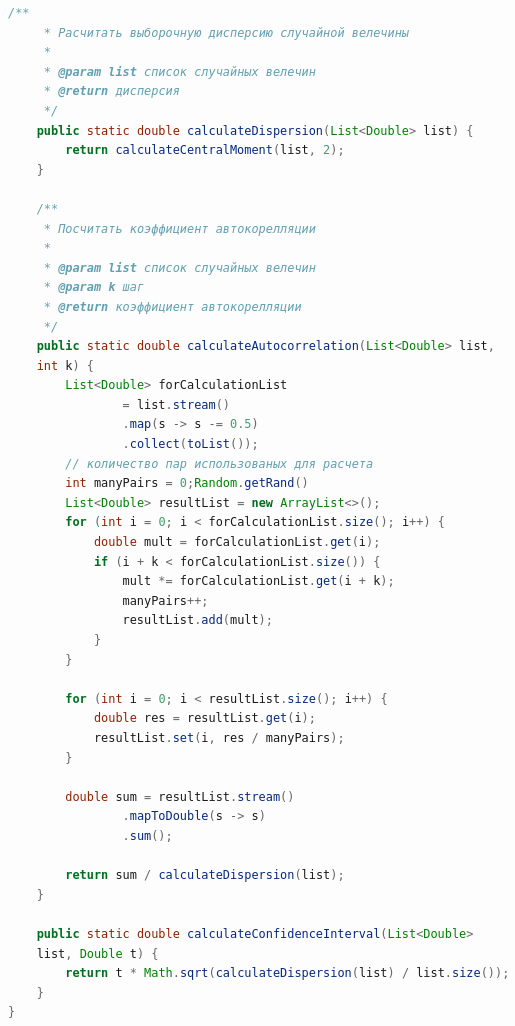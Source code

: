 \documentclass[a4paper,12pt]{article}
\begin{document}
\begin{lstlisting}[language=Java, title=Рассчет и отображение параметров распределения]
    /**
     * Расчитать выборочную дисперсию случайной велечины
     *
     * @param list список случайных велечин
     * @return дисперсия
     */
    public static double calculateDispersion(List<Double> list) {
        return calculateCentralMoment(list, 2);
    }

    /**
     * Посчитать коэффициент автокорелляции
     *
     * @param list список случайных велечин
     * @param k шаг
     * @return коэффициент автокорелляции
     */
    public static double calculateAutocorrelation(List<Double> list, 
    int k) {
        List<Double> forCalculationList
                = list.stream()
                .map(s -> s -= 0.5)
                .collect(toList());
        // количество пар использованых для расчета
        int manyPairs = 0;Random.getRand()
        List<Double> resultList = new ArrayList<>();
        for (int i = 0; i < forCalculationList.size(); i++) {
            double mult = forCalculationList.get(i);
            if (i + k < forCalculationList.size()) {
                mult *= forCalculationList.get(i + k);
                manyPairs++;
                resultList.add(mult);
            }
        }

        for (int i = 0; i < resultList.size(); i++) {
            double res = resultList.get(i);
            resultList.set(i, res / manyPairs);
        }

        double sum = resultList.stream()
                .mapToDouble(s -> s)
                .sum();

        return sum / calculateDispersion(list);
    }

    public static double calculateConfidenceInterval(List<Double> 
    list, Double t) {
        return t * Math.sqrt(calculateDispersion(list) / list.size());
    }
}

\end{lstlisting}
\end{document}
